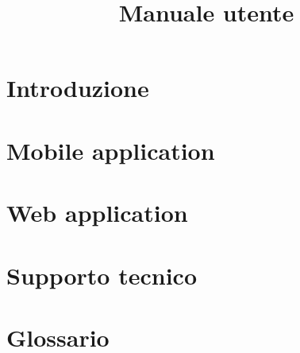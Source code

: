 \documentclass{article}
\title{Manuale utente}
\begin{document}


\section{Introduzione}%
\label{sec:introduzione}


\newpage
\section{Mobile application}%
\label{sec:mobile_application}


\newpage
\section{Web application}%
\label{sec:web_application}


\newpage
\section{Supporto tecnico}%
\label{sec:supporto_tecnico}


\newpage
\appendix
\setcounter{secnumdepth}{1} %
\section{Glossario}%
\label{sec:glossario}

\end{document}
